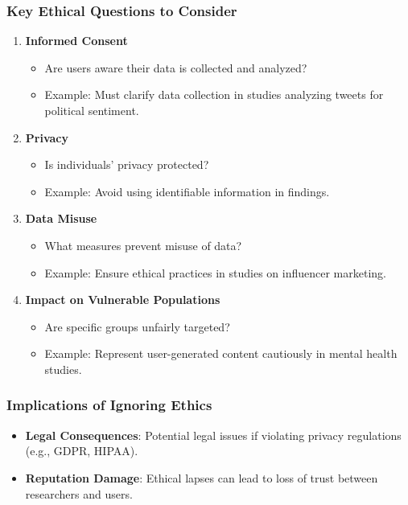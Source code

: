\documentclass{beamer}
\begin{document}
\begin{frame}[fragile]
    \frametitle{Key Ethical Questions to Consider}
    \begin{enumerate}
        \item \textbf{Informed Consent}
            \begin{itemize}
                \item Are users aware their data is collected and analyzed?
                \item Example: Must clarify data collection in studies analyzing tweets for political sentiment.
            \end{itemize}
        
        \item \textbf{Privacy}
            \begin{itemize}
                \item Is individuals' privacy protected?
                \item Example: Avoid using identifiable information in findings.
            \end{itemize}
        
        \item \textbf{Data Misuse}
            \begin{itemize}
                \item What measures prevent misuse of data?
                \item Example: Ensure ethical practices in studies on influencer marketing.
            \end{itemize}

        \item \textbf{Impact on Vulnerable Populations}
            \begin{itemize}
                \item Are specific groups unfairly targeted?
                \item Example: Represent user-generated content cautiously in mental health studies.
            \end{itemize}
    \end{enumerate}
\end{frame}

\begin{frame}[fragile]
    \frametitle{Implications of Ignoring Ethics}
    \begin{itemize}
        \item \textbf{Legal Consequences}: Potential legal issues if violating privacy regulations (e.g., GDPR, HIPAA).
        \item \textbf{Reputation Damage}: Ethical lapses can lead to loss of trust between researchers and users.
    \end{itemize}
\end{frame}
\end{document}
